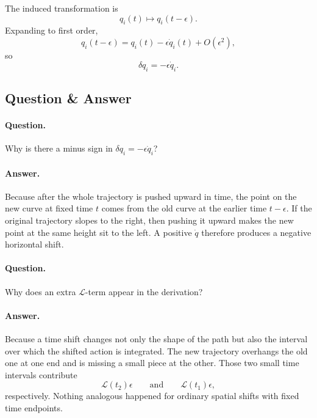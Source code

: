 The induced transformation is
\begin{equation}
q_i(t)\mapsto q_i(t-\epsilon).
\end{equation}
Expanding to first order,
\begin{equation}
q_i(t-\epsilon)=q_i(t)-\epsilon \dot q_i(t)+O(\epsilon^2),
\end{equation}
so
\begin{equation}
\delta q_i=-\epsilon \dot q_i.
\end{equation}

\subsection{Question \& Answer}

\paragraph{Question.} Why is there a minus sign in \(\delta q_i=-\epsilon \dot q_i\)?

\paragraph{Answer.} Because after the whole trajectory is pushed upward in time, the point on the new curve at fixed time \(t\) comes from the old curve at the earlier time \(t-\epsilon\). If the original trajectory slopes to the right, then pushing it upward makes the new point at the same height sit to the left. A positive \(\dot q\) therefore produces a negative horizontal shift.

\paragraph{Question.} Why does an extra \(\mathcal{L}\)-term appear in the derivation?

\paragraph{Answer.} Because a time shift changes not only the shape of the path but also the interval over which the shifted action is integrated. The new trajectory overhangs the old one at one end and is missing a small piece at the other. Those two small time intervals contribute
\begin{equation}
\mathcal{L}(t_2)\epsilon
\qquad \text{and} \qquad
\mathcal{L}(t_1)\epsilon,
\end{equation}
respectively. Nothing analogous happened for ordinary spatial shifts with fixed time endpoints.

